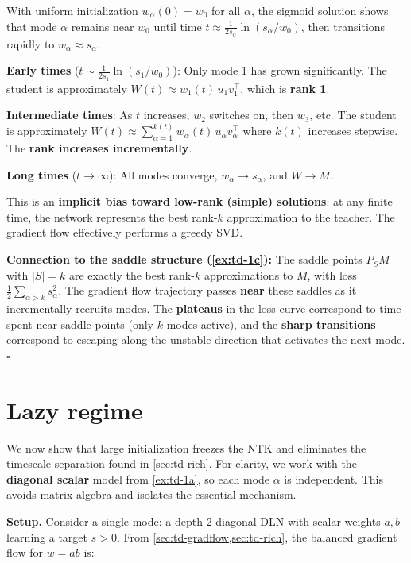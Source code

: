 \documentclass[11pt]{article}
\begin{document}
\begin{solution}[ex:td-3c]
With uniform initialization \(w_\alpha(0) = w_0\) for all
\(\alpha\), the sigmoid solution shows that mode \(\alpha\) remains near
\(w_0\) until time \(t \approx \frac{1}{2s_\alpha}\ln(s_\alpha/w_0)\),
then transitions rapidly to \(w_\alpha \approx s_\alpha\).

\textbf{Early times} (\(t \sim \frac{1}{2s_1}\ln(s_1/w_0)\)): Only mode
1 has grown significantly. The student is approximately
\(W(t) \approx w_1(t)\,u_1 v_1^\top\), which is \textbf{rank 1}.

\textbf{Intermediate times}: As \(t\) increases, \(w_2\) switches on,
then \(w_3\), etc. The student is approximately
\(W(t) \approx \sum_{\alpha=1}^{k(t)} w_\alpha(t)\,u_\alpha v_\alpha^\top\)
where \(k(t)\) increases stepwise. The \textbf{rank increases
incrementally}.

\textbf{Long times} (\(t \to \infty\)): All modes converge,
\(w_\alpha \to s_\alpha\), and \(W \to M\).

This is an \textbf{implicit bias toward low-rank (simple) solutions}: at
any finite time, the network represents the best rank-\(k\)
approximation to the teacher. The gradient flow effectively performs a
greedy SVD.

\textbf{Connection to the saddle structure (\cref{ex:td-1c}):} The saddle
points \(P_S M\) with \(|S| = k\) are exactly the best rank-\(k\)
approximations to \(M\), with loss
\(\frac{1}{2}\sum_{\alpha > k} s_\alpha^2\). The gradient flow
trajectory passes \textbf{near} these saddles as it incrementally
recruits modes. The \textbf{plateaus} in the loss curve correspond to
time spent near saddle points (only \(k\) modes active), and the
\textbf{sharp transitions} correspond to escaping along the unstable
direction that activates the next mode. \(\square\)
\end{solution}

\section{Lazy regime}
\label{sec:td-lazy}

We now show that large initialization freezes the NTK and eliminates the
timescale separation found in \cref{sec:td-rich}. For clarity, we work with the
\textbf{diagonal scalar} model from \cref{ex:td-1a}, so each mode
\(\alpha\) is independent. This avoids matrix algebra and isolates the
essential mechanism.

\textbf{Setup.} Consider a single mode: a depth-2 diagonal
DLN with scalar weights \(a, b\) learning a target \(s > 0\). From
\cref{sec:td-gradflow,sec:td-rich}, the balanced gradient flow for \(w = ab\) is:
\end{document}
